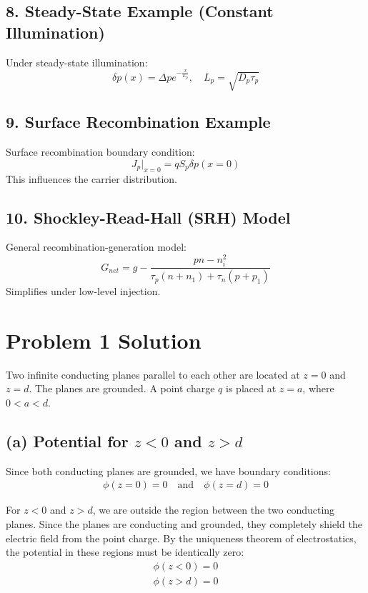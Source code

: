\documentclass{article}
\begin{document}
\subsection*{8. Steady-State Example (Constant Illumination)}
Under steady-state illumination:
\[
\delta p(x) = \Delta p e^{-\frac{x}{L_p}}, \quad L_p = \sqrt{D_p\tau_p}
\]

\subsection*{9. Surface Recombination Example}
Surface recombination boundary condition:
\[
J_p\big|_{x=0} = q S_p \delta p(x=0)
\]
This influences the carrier distribution.

\subsection*{10. Shockley-Read-Hall (SRH) Model}
General recombination-generation model:
\[
G_{net} = g - \frac{pn - n_i^2}{\tau_p(n+n_1) + \tau_n(p+p_1)}
\]
Simplifies under low-level injection.

\section*{Problem 1 Solution}

Two infinite conducting planes parallel to each other are located at $z = 0$ and $z = d$. The planes are grounded. A point charge $q$ is placed at $z = a$, where $0 < a < d$.

\subsection*{(a) Potential for $z < 0$ and $z > d$}

Since both conducting planes are grounded, we have boundary conditions:
\begin{align}
\phi(z = 0) = 0 \quad \text{and} \quad \phi(z = d) = 0
\end{align}

For $z < 0$ and $z > d$, we are outside the region between the two conducting planes. Since the planes are conducting and grounded, they completely shield the electric field from the point charge. By the uniqueness theorem of electrostatics, the potential in these regions must be identically zero:
\begin{align}
\phi(z < 0) = 0\\
\phi(z > d) = 0
\end{align}
\end{document}
